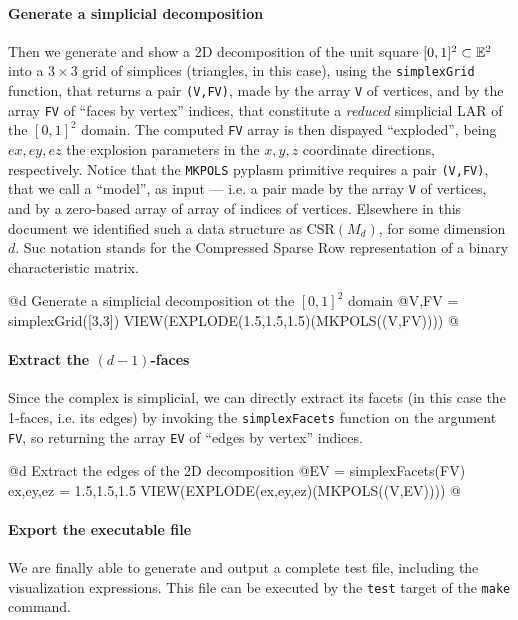 \documentclass[11pt,oneside]{article}	%
\begin{document}
\paragraph{Generate a simplicial decomposition}
Then we generate and show a 2D decomposition of the unit square $[0,1]^2\subset\mathbb{E}^2$ into a $3\times 3$ grid of simplices (triangles, in this case), using the \texttt{simplexGrid} function, that returns a pair \texttt{(V,FV)}, made by the array \texttt{V} of vertices, and by the array \texttt{FV} of ``faces by vertex'' indices, that constitute a \emph{reduced} simplicial LAR of the $[0,1]^2$ domain. The computed \texttt{FV} array is then dispayed ``exploded'', being $ex,ey,ez$ the explosion parameters in the $x,y,z$ coordinate directions, respectively. Notice that the \texttt{MKPOLS} pyplasm primitive requires a pair \texttt{(V,FV)}, that we call a ``model'', as input --- i.e. a pair made by the array \texttt{V} of vertices, and by a zero-based array of array of indices of vertices. Elsewhere in this document we identified such a data structure as CSR$(M_d)$, for some dimension $d$. Suc notation stands for the Compressed Sparse Row representation of a binary characteristic matrix.

@d Generate a simplicial decomposition ot the $[0,1]^2$ domain
@{V,FV = simplexGrid([3,3])
VIEW(EXPLODE(1.5,1.5,1.5)(MKPOLS((V,FV))))
@}

\paragraph{Extract the $(d-1)$-faces}
Since the complex is simplicial, we can directly extract its facets (in this case the 1-faces, i.e. its edges) by invoking the \texttt{simplexFacets} function on the argument \texttt{FV}, so returning the array \texttt{EV} of ``edges by vertex'' indices. 

@d Extract the edges of the 2D decomposition
@{EV = simplexFacets(FV)
ex,ey,ez = 1.5,1.5,1.5
VIEW(EXPLODE(ex,ey,ez)(MKPOLS((V,EV))))
@}

\paragraph{Export the executable file}
We are finally able to generate and output a complete test file, including the visualization expressions. This file can be executed by the \texttt{test} target of the \texttt{make} command.
\end{document}
